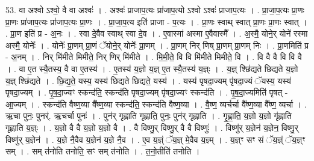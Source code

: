 \documentclass[17pt]{extarticle}
\begin{document}
53. वा अश्वो ऽश्वो॒ वै वा अश्वः॑ । . अश्वः॑ प्राजाप॒त्यः प्रा॑जाप॒त्यो ऽश्वो ऽश्वः॑ प्राजाप॒त्यः । . प्रा॒जा॒प॒त्यः प्रा॒णः प्रा॒णः प्रा॑जाप॒त्यः प्रा॑जाप॒त्यः प्रा॒णः । . प्रा॒जा॒प॒त्य इति॑ प्राजा - प॒त्यः । . प्रा॒णः स्वाथ् स्वात् प्रा॒णः प्रा॒णः स्वात् । . प्रा॒ण इति॑ प्र - अ॒नः । . स्वा दे॒वैव स्वाथ् स्वा दे॒व । . ए॒वास्मा॑ अस्मा ए॒वैवास्मै᳚ । . अ॒स्मै॒ योने॒र् योने॑ रस्मा अस्मै॒ योनेः᳚ । . योनेः᳚ प्रा॒णम् प्रा॒णं ॅयोने॒र् योनेः᳚ प्रा॒णम् । . प्रा॒णम् निर् णिष् प्रा॒णम् प्रा॒णम् निः । . प्रा॒णमिति॑ प्र - अ॒नम् । . निर् मि॑मीते मिमीते॒ निर् णिर् मि॑मीते । . मि॒मी॒ते॒ वि वि मि॑मीते मिमीते॒ वि । . वि वै वै वि वि वै । . वा ए॒त स्यै॒तस्य॒ वै वा ए॒तस्य॑ । . ए॒तस्य॑ य॒ज्ञो य॒ज्ञ् ए॒त स्यै॒तस्य॑ य॒ज्ञ्ः । . य॒ज्ञ् श्छि॑द्यते छिद्यते य॒ज्ञो य॒ज्ञ् श्छि॑द्यते । . छि॒द्य॒ते॒ यस्य॒ यस्य॑ छिद्यते छिद्यते॒ यस्य॑ । . यस्य॑ पृषदा॒ज्यम् पृ॑षदा॒ज्यं ॅयस्य॒ यस्य॑ पृषदा॒ज्यम् । . पृ॒ष॒दा॒ज्यꣳ स्कन्द॑ति॒ स्कन्द॑ति पृषदा॒ज्यम् पृ॑षदा॒ज्यꣳ स्कन्द॑ति । . पृ॒ष॒दा॒ज्यमिति॑ पृषत् - आ॒ज्यम् । . स्कन्द॑ति वैष्ण॒व्या वै᳚ष्ण॒व्या स्कन्द॑ति॒ स्कन्द॑ति वैष्ण॒व्या । . वै॒ष्ण॒ व्यर्चर्चा वै᳚ष्ण॒व्या वै᳚ष्ण॒ व्यर्चा । . ऋ॒चा पुनः॒ पुनर्॑. ऋ॒चर्चा पुनः॑ । . पुन॑र् गृह्णाति गृह्णाति॒ पुनः॒ पुन॑र् गृह्णाति । . गृ॒ह्णा॒ति॒ य॒ज्ञो य॒ज्ञो गृ॑ह्णाति गृह्णाति य॒ज्ञ्ः । . य॒ज्ञो वै वै य॒ज्ञो य॒ज्ञो वै । . वै विष्णु॒र् विष्णु॒र् वै वै विष्णुः॑ । . विष्णु॑र् य॒ज्ञेन॑ य॒ज्ञेन॒ विष्णु॒र् विष्णु॑र् य॒ज्ञेन॑ । . य॒ज्ञे नै॒वैव य॒ज्ञेन॑ य॒ज्ञे नै॒व । . ए॒व य॒ज्ञ्ं ॅय॒ज्ञ् मे॒वैव य॒ज्ञ्म् । . य॒ज्ञ्ꣳ सꣳ सं ॅय॒ज्ञ्ं ॅय॒ज्ञ्ꣳ सम् । . सम् त॑नोति तनोति॒ सꣳ सम् त॑नोति । . त॒नो॒तीति॑ तनोति । \newline
\end{document}
